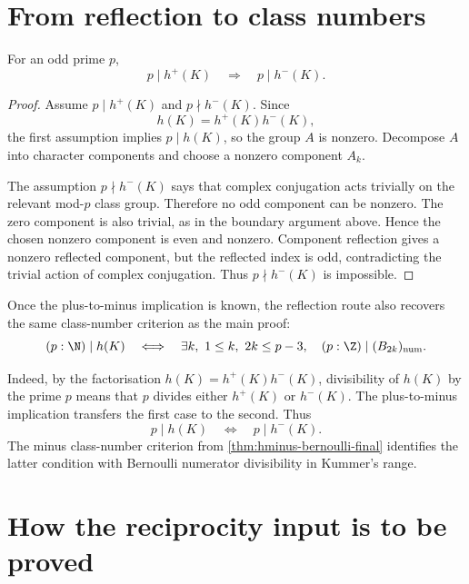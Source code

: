 \section{From reflection to class numbers}

\begin{theorem}
  \label{thm:abandoned-reflection-plus-minus}
  \leanok
For an odd prime \(p\),
\[
  p\mid h^+(K)\quad\Longrightarrow\quad p\mid h^-(K).
\]
\end{theorem}

\begin{proof}\leanok
Assume \(p\mid h^+(K)\) and \(p\nmid h^-(K)\).  Since
\[
  h(K)=h^+(K)h^-(K),
\]
the first assumption implies \(p\mid h(K)\), so the group \(A\) is nonzero.
Decompose \(A\) into character components and choose a nonzero component
\(A_k\).

The assumption \(p\nmid h^-(K)\) says that complex conjugation acts trivially
on the relevant mod-\(p\) class group.  Therefore no odd component can be
nonzero.  The zero component is also trivial, as in the boundary argument
above.  Hence the chosen nonzero component is even and nonzero.  Component
reflection gives a nonzero reflected component, but the reflected index is
odd, contradicting the trivial action of complex conjugation.  Thus
\(p\nmid h^-(K)\) is impossible.
\end{proof}

Once the plus-to-minus implication is known, the reflection route also
recovers the same class-number criterion as the main proof:
\[
  (p:\N)\mid h(K)
  \quad\Longleftrightarrow\quad
  \exists k,\ 1\le k,\ 2k\le p-3,\quad
  (p:\Z)\mid (B_{2k})_{\mathrm{num}}.
\]

Indeed, by the factorisation \(h(K)=h^+(K)h^-(K)\), divisibility of \(h(K)\)
by the
prime \(p\) means that \(p\) divides either \(h^+(K)\) or \(h^-(K)\).  The
plus-to-minus implication transfers the first case to the second.  Thus
\[
  p\mid h(K)\quad\Longleftrightarrow\quad p\mid h^-(K).
\]
The minus class-number criterion from \cref{thm:hminus-bernoulli-final}
identifies the latter condition with Bernoulli numerator divisibility in
Kummer's range.

\section{How the reciprocity input is to be proved}

